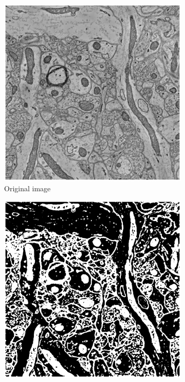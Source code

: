 \documentclass[a4paper, 11pt]{article}
\numberwithin{equation}{section}
\begin{document}
		\begin{figure}[!ht]	
			\centering
			\begin{subfigure}[t]{.3\textwidth}
				\centering
				\includegraphics[width=\textwidth]{1_original}
				\caption{Original image}		
			\end{subfigure}
			\quad
			\begin{subfigure}[t]{.3\textwidth}
				\centering
				\includegraphics[width=\textwidth]{3_threshold}

\end{subfigure}
\end{figure}
\end{document}
